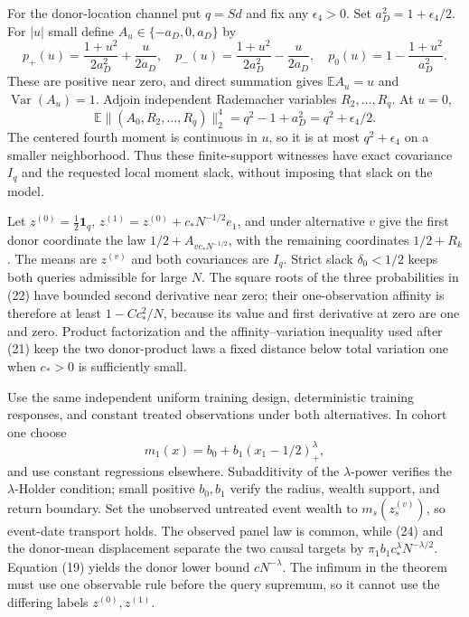 For the donor-location channel put \(q=Sd\) and fix any
\(\epsilon_4>0\).  Set \(a_D^2=1+\epsilon_4/2\).  For \(|u|\) small define
\(A_u\in\{-a_D,0,a_D\}\) by
\[
 p_+(u)=\frac{1+u^2}{2a_D^2}+\frac{u}{2a_D},\quad
 p_-(u)=\frac{1+u^2}{2a_D^2}-\frac{u}{2a_D},\quad
 p_0(u)=1-\frac{1+u^2}{a_D^2}.                                \tag{22}
\]
These are positive near zero, and direct summation gives
\(\mathbb EA_u=u\) and \(\operatorname{Var}(A_u)=1\).  Adjoin independent
Rademacher variables \(R_2,\ldots,R_q\).  At \(u=0\),
\[
 \mathbb E\|(A_0,R_2,\ldots,R_q)\|_2^4
 =q^2-1+a_D^2=q^2+\epsilon_4/2.                               \tag{23}
\]
The centered fourth moment is continuous in \(u\), so it is at most
\(q^2+\epsilon_4\) on a smaller neighborhood.  Thus these finite-support
witnesses have exact covariance \(I_q\) and the requested local moment
slack, without imposing that slack on the model.

Let \(z^{(0)}=\tfrac12\mathbf1_q\),
\(z^{(1)}=z^{(0)}+c_*N^{-1/2}e_1\), and under alternative \(v\) give the
first donor coordinate the law \(1/2+A_{vc_*N^{-1/2}}\), with the remaining
coordinates \(1/2+R_k\).  The means are \(z^{(v)}\) and both covariances are
\(I_q\).  Strict slack \(\delta_0<1/2\) keeps both queries admissible for
large \(N\).  The square roots of the three probabilities in (22) have
bounded second derivative near zero; their one-observation affinity is
therefore at least \(1-Cc_*^2/N\), because its value and first derivative at
zero are one and zero.  Product factorization and the affinity--variation
inequality used after (21) keep the two donor-product laws a fixed distance
below total variation one when \(c_*>0\) is sufficiently small.

Use the same independent uniform training design, deterministic training
responses, and constant treated observations under both alternatives.  In
cohort one choose
\[
 m_1(x)=b_0+b_1(x_1-1/2)_+^\lambda,                           \tag{24}
\]
and use constant regressions elsewhere.  Subadditivity of the
\(\lambda\)-power verifies the \(\lambda\)-Holder condition; small positive
\(b_0,b_1\) verify the radius, wealth support, and return boundary.  Set the
unobserved untreated event wealth to \(m_s(z_s^{(v)})\), so event-date
transport holds.  The observed panel law is common, while (24) and the
donor-mean displacement separate the two causal targets by
\(\pi_1b_1c_*^\lambda N^{-\lambda/2}\).  Equation (19) yields the donor
lower bound \(cN^{-\lambda}\).  The infimum in the theorem must use one
observable rule before the query supremum, so it cannot use the differing
labels \(z^{(0)},z^{(1)}\).

